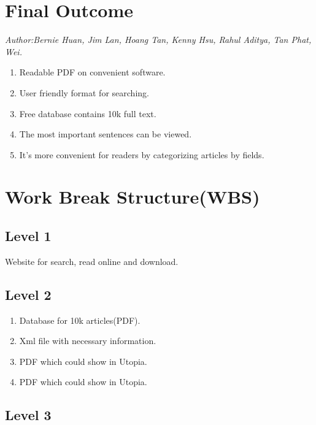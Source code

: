 
\section{Final Outcome}
\textit{\footnotesize Author:Bernie Huan, Jim Lan, Hoang Tan, Kenny Hsu, Rahul Aditya, Tan Phat, Wei.}\\
	\begin{enumerate}
		\item Readable PDF on convenient software.
		\item User friendly format for searching.
		\item Free database contains 10k full text.
		\item The most important sentences can be viewed.
		\item It’s more convenient for readers by categorizing articles by fields.
	\end{enumerate}
	
\section{Work Break Structure(WBS)}
	\subsection*{Level 1}
	Website for search, read online and download.
	\subsection*{Level 2}
		\begin{enumerate}
			\item Database for 10k articles(PDF).
			\item Xml file with necessary  information.
			\item PDF which could show in Utopia.
			\item PDF which could show in Utopia.
		\end{enumerate}	
	\subsection*{Level 3}	
